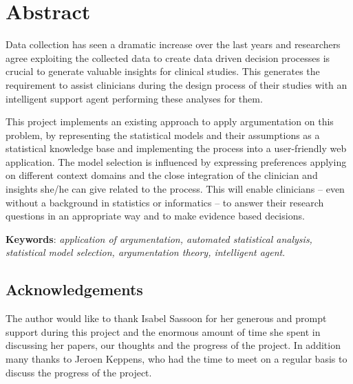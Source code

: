 \section*{Abstract}

Data collection has seen a dramatic increase over the last years and researchers agree exploiting the collected data to create data driven decision processes is crucial to generate valuable insights for clinical studies. This generates the requirement to assist clinicians during the design process of their studies with an intelligent support agent performing these analyses for them. 

This project implements an existing approach to apply argumentation on this problem, by representing the statistical models and their assumptions as a statistical knowledge base and implementing the process into a user-friendly web application. The model selection is influenced by expressing preferences applying on different context domains and the close integration of the clinician and insights she/he can give related to the process. This will enable clinicians -- even without a background in statistics or informatics -- to answer their research questions in an appropriate way and to make evidence based decisions. 

\bigskip
\bigskip

\textbf{Keywords}: \textit{application of argumentation, automated statistical analysis, statistical model selection, argumentation theory, intelligent agent}.

\bigskip
\bigskip

\subsection*{Acknowledgements}
The author would like to thank Isabel Sassoon for her generous and prompt support during this project and the enormous amount of time she spent in discussing her papers, our thoughts and the progress of the project. In addition many thanks to Jeroen Keppens, who had the time to meet on a regular basis to discuss the progress of the project.